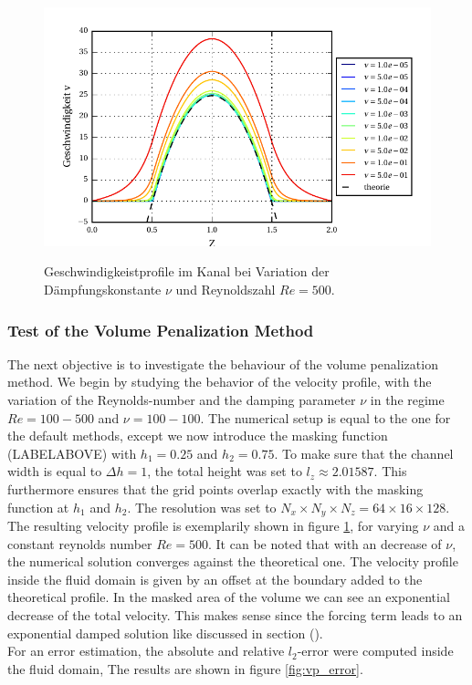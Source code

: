 \begin{figure}[!hbtp]
  \centering
  \includegraphics{gfx/immersed_boundary/2_vp/vp_profile.pdf}\label{fig:vp_flow}
  \caption{Geschwindigkeistprofile im Kanal bei Variation der Dämpfungskonstante $\nu$ und Reynoldszahl $Re=500$.}
\end{figure}

\subsubsection{Test of the Volume Penalization Method}

The next objective is to investigate the behaviour of the volume penalization method.
We begin by studying the behavior of the velocity profile, with the variation of the Reynolds-number and the damping parameter $\nu$ in the regime $Re=100-500$ and $\nu=100-100$.
The numerical setup is equal to the one for the default methods, except we now introduce the masking function (LABELABOVE) with $h_1=0.25$ and $h_2=0.75$.
To make sure that the channel width is equal to $\Delta h = 1$, the total height was set to $l_z\approx2.01587$. This furthermore ensures that the grid points overlap exactly
with the masking function at $h_1$ and $h_2$. The resolution was set to $N_x\times N_y\times N_z = 64\times16\times128$.\\
The resulting velocity profile is exemplarily shown in figure \ref{fig:vp_flow}, for varying $\nu$ and a constant reynolds number $Re=500$.
It can be noted that with an decrease of $\nu$, the numerical solution converges against the theoretical one.
The velocity profile inside the fluid domain is given by an offset at the boundary added to the theoretical profile.
In the masked area of the volume we can see an exponential decrease of the total velocity. This makes sense since the forcing term
leads to an exponential damped solution like discussed in section ().\\
For an error estimation, the absolute and relative $l_2$-error were computed inside the fluid domain,
The results are shown in figure \ref{fig:vp_error}.

